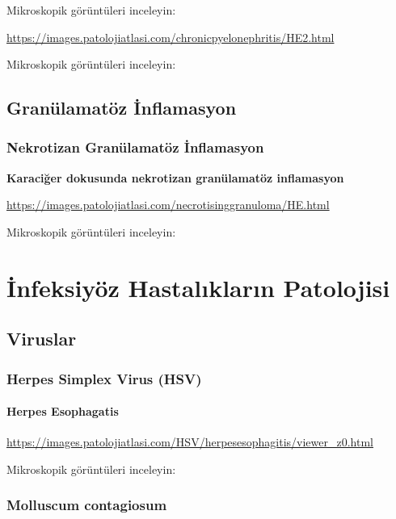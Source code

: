 \documentclass[
  letterpaper,
  DIV=11,
  numbers=noendperiod]{scrreprt}
\begin{document}
Mikroskopik görüntüleri inceleyin:

\url{https://images.patolojiatlasi.com/chronicpyelonephritis/HE2.html}

Mikroskopik görüntüleri inceleyin:

\hypertarget{granuxfclamatuxf6z-inflamasyon}{%
\chapter{Granülamatöz
İnflamasyon}\label{granuxfclamatuxf6z-inflamasyon}}

\hypertarget{nekrotizan-granuxfclamatuxf6z-inflamasyon}{%
\section{Nekrotizan Granülamatöz
İnflamasyon}\label{nekrotizan-granuxfclamatuxf6z-inflamasyon}}

\textbf{Karaciğer dokusunda nekrotizan granülamatöz inflamasyon}

\url{https://images.patolojiatlasi.com/necrotisinggranuloma/HE.html}

Mikroskopik görüntüleri inceleyin:

\part{İnfeksiyöz Hastalıkların Patolojisi}

\hypertarget{viruslar}{%
\chapter{Viruslar}\label{viruslar}}

\hypertarget{herpes-simplex-virus-hsv}{%
\section{Herpes Simplex Virus (HSV)}\label{herpes-simplex-virus-hsv}}

\hypertarget{herpes-esophagatis}{%
\subsection{Herpes Esophagatis}\label{herpes-esophagatis}}

\url{https://images.patolojiatlasi.com/HSV/herpesesophagitis/viewer_z0.html}

Mikroskopik görüntüleri inceleyin:

\hypertarget{molluscum-contagiosum}{%
\section{Molluscum contagiosum}\label{molluscum-contagiosum}}
\end{document}
